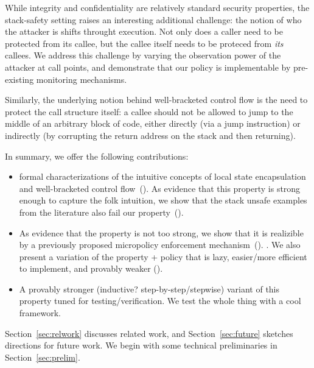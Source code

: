 \documentclass[acmsmall,review,anonymous]{acmart}\settopmatter{printfolios=true,printccs=false,printacmref=false}
\begin{document}
While integrity and confidentiality are relatively standard security
properties, the stack-safety setting raises an interesting additional
challenge:
the notion of who the attacker is shifts throught execution. Not only
does a caller need to be protected from its callee, but the callee
itself needs to be proteced from {\em its} callees.
We address this challenge by varying the observation power
of the attacker at call points, and demonstrate that our policy is
implementable by pre-existing monitoring mechanisms. 

Similarly, the underlying notion behind well-bracketed control flow is
the need to protect the call structure itself: a callee should not be
allowed to jump to the middle of an arbitrary block of code, either
directly (via a jump instruction) or indirectly (by corrupting the return
address on the stack and then returning). 

In summary, we offer the following contributions:
\begin{itemize}
\item {} formal characterizations of the
  intuitive concepts of local state encapsulation and
  well-bracketed control flow~().  As evidence that this
  property is strong enough to capture the folk intuition, we show
  that the stack unsafe examples from the literature also fail our
  property~().
\item As evidence that the property is not too strong, we show that it is
  realizible by
  a previously proposed micropolicy enforcement
  mechanism~(). . We also present a variation of the
  property + policy that is lazy, easier/more efficient to implement,
  and provably weaker ().
\item A provably stronger (inductive? step-by-step/stepwise) variant
  of this property tuned for testing/verification.  We test the whole
  thing with a cool framework. 
\end{itemize}
Section~\ref{sec:relwork} discusses related work, and
Section~\ref{sec:future} sketches directions for future work.
%
We begin with some technical preliminaries in
Section~\ref{sec:prelim}.
\end{document}
